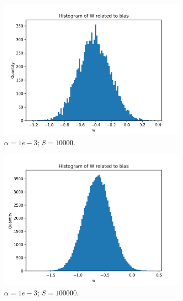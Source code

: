 \documentclass{article}
\begin{document}
\begin{figure}
\begin{subfigure}[t]{0.24\textwidth}
    \includegraphics[width=\linewidth]{hist_featbias_10000_sample_10000.png}
    \caption{$\alpha = 1e-3$; $S = 10000$.}
  \end{subfigure}
  \hfill
  \begin{subfigure}[t]{0.24\textwidth}
    \centering
    \includegraphics[width=\linewidth]{hist_featbias_10000_sample_100000.png}
    \caption{$\alpha = 1e-3$; $S = 100000$.}
  \end{subfigure}
  \begin{subfigure}[t]{0.24\textwidth}
    \centering

\end{subfigure}
\end{figure}
\end{document}
